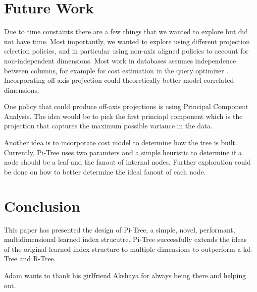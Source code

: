 \documentclass[sigconf,10pt]{acmart}
\begin{document}
\section{Future Work}

Due to time constaints there are a few things
that we wanted to explore but did not have time.
Most importantly, we wanted to explore using different
projection selection policies, and in particular using
non-axis aligned policies to account for non-independent dimensions.
Most work in databases assumes independence between columns,
for example for cost estimation in the query optimizer \cite{SelectivityEstimation}.
Incorporating off-axis projection could theoretically better model 
correlated dimensions.

One policy that could produce off-axis projections is using
Principal Component Analysis. The idea would be to 
pick the first princiapl component which is the projection that captures
the maximum possible variance in the data.

Another idea is to incorporate cost model to determine how the tree is built.
Currently, Pi-Tree uses two paramters and a simple heuristic to determine
if a node should be a leaf and the fanout of internal nodes.
Further exploration could be done on how to better determine the ideal
fanout of each node.

\section{Conclusion}

This paper has presented the design of Pi-Tree, a simple,
novel, performant, multidimensional learned index strucutre.
Pi-Tree successfully extends the ideas of the original learned index
structure to multiple dimensions to outperform a kd-Tree and R-Tree.

\begin{acks}
Adam wants to thank his girlfriend Akshaya for always being there and
helping out.
\end{acks}



\end{document}
